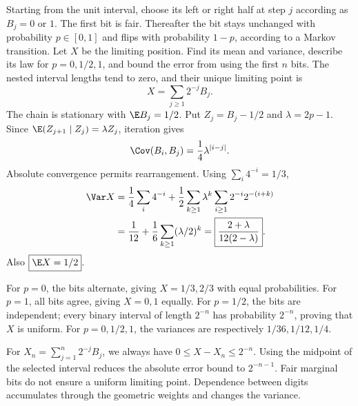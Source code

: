 Starting from the unit interval, choose its left or right half at step $j$ according as $B_j=0$ or $1$. The first bit is fair. Thereafter the bit stays unchanged with probability $p\in[0,1]$ and flips with probability $1-p$, according to a Markov transition. Let $X$ be the limiting position. Find its mean and variance, describe its law for $p=0,1/2,1$, and bound the error from using the first $n$ bits.
\solution The nested interval lengths tend to zero, and their unique limiting point is
\[
X=\sum_{j\ge1}2^{-j}B_j.
\]
The chain is stationary with $\E B_j=1/2$. Put $Z_j=B_j-1/2$ and $\lambda=2p-1$. Since $\E(Z_{j+1}\mid Z_j)=\lambda Z_j$, iteration gives
\[
\Cov(B_i,B_j)=\frac14\lambda^{|i-j|}.
\]
Absolute convergence permits rearrangement. Using $\sum_i4^{-i}=1/3$,
\[
\begin{aligned}
\Var X
&=\frac14\sum_i4^{-i}
+\frac12\sum_{k\ge1}\lambda^k\sum_{i\ge1}2^{-i}2^{-(i+k)}\\
&=\frac1{12}+\frac16\sum_{k\ge1}(\lambda/2)^k
=\boxed{\frac{2+\lambda}{12(2-\lambda)}}.
\end{aligned}
\]
Also $\boxed{\E X=1/2}$.

For $p=0$, the bits alternate, giving $X=1/3,2/3$ with equal probabilities. For $p=1$, all bits agree, giving $X=0,1$ equally. For $p=1/2$, the bits are independent; every binary interval of length $2^{-n}$ has probability $2^{-n}$, proving that $X$ is uniform. For $p=0,1/2,1$, the variances are respectively $1/36,1/12,1/4$.

For $X_n=\sum_{j=1}^n2^{-j}B_j$, we always have $0\le X-X_n\le2^{-n}$. Using the midpoint of the selected interval reduces the absolute error bound to $2^{-n-1}$.
\insight Fair marginal bits do not ensure a uniform limiting point. Dependence between digits accumulates through the geometric weights and changes the variance.
